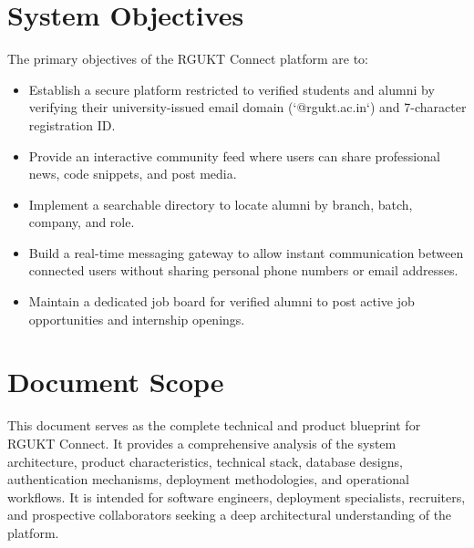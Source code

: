 \section{System Objectives}
The primary objectives of the RGUKT Connect platform are to:
\begin{itemize}
    \item Establish a secure platform restricted to verified students and alumni by verifying their university-issued email domain (`@rgukt.ac.in`) and 7-character registration ID.
    \item Provide an interactive community feed where users can share professional news, code snippets, and post media.
    \item Implement a searchable directory to locate alumni by branch, batch, company, and role.
    \item Build a real-time messaging gateway to allow instant communication between connected users without sharing personal phone numbers or email addresses.
    \item Maintain a dedicated job board for verified alumni to post active job opportunities and internship openings.
\end{itemize}

\section{Document Scope}
This document serves as the complete technical and product blueprint for RGUKT Connect. It provides a comprehensive analysis of the system architecture, product characteristics, technical stack, database designs, authentication mechanisms, deployment methodologies, and operational workflows. It is intended for software engineers, deployment specialists, recruiters, and prospective collaborators seeking a deep architectural understanding of the platform.
